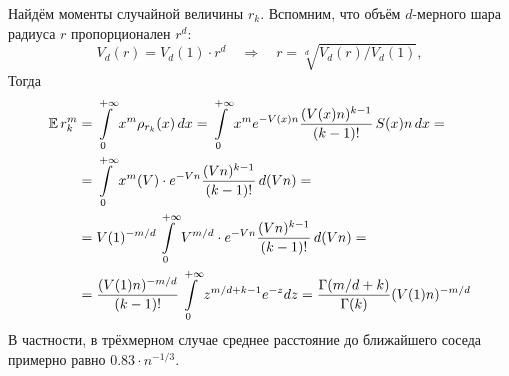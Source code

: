 Найдём моменты случайной величины $ r_k $.
Вспомним, что объём $ d $-мерного шара радиуса $ r $ пропорционален $ r^d $:
\[
    V_d(r) = V_d(1) \cdot r^d \quad \Longrightarrow \quad r = \sqrt[d]{V_d(r) / V_d(1)},
\]
Тогда
%
{\allowdisplaybreaks
\begin{align}
    \label{eq:low_concentration:kNN_distance_expectation}
    \operatorname{\mathbb{E}} r_k^m &= \int\limits_0^{+\infty} x^m \rho_{r_k}(x) \, dx =
    \int\limits_0^{+\infty} x^m e^{-V(x) n} \frac{(V(x) n)^{k-1}}{(k-1)!} \, S(x) n \, dx = \\
    &= \int\limits_0^{+\infty} x^m(V) \cdot e^{-V n} \frac{(V n)^{k-1}}{(k-1)!} \, d(V n) = \\
    &= V(1)^{-m/d} \int\limits_0^{+\infty} V^{m/d} \cdot e^{-V n} \frac{(V n)^{k-1}}{(k-1)!} \, d(V n) = \\
    &= \frac{(V(1) n)^{-m/d}}{(k-1)!} \int\limits_0^{+\infty} z^{m/d + k - 1} e^{-z} dz
    = \frac{\Gamma(m/d + k)}{\Gamma(k)} (V(1) n)^{-m/d}
\end{align}
}
В частности, в трёхмерном случае среднее расстояние до ближайшего соседа примерно равно $ 0.83 \cdot n^{-1/3} $.

